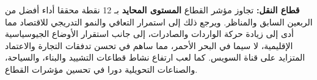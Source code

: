 \textbf{قطاع النقل:} تجاوز مؤشر القطاع \textbf{المستوى المحايد} بـ 12 نقطة محققا أداء أفضل من الربعين السابق والمناظر. ويرجع ذلك إلى استمرار التعافي والنمو التدريجي للاقتصاد مما أدى إلى زيادة حركة الواردات والصادرات، إلى جانب استقرار الأوضاع الجيوسياسية الإقليمية، لا سيما في البحر الأحمر، مما ساهم في تحسن تدفقات التجارة والاعتماد المتزايد على قناة السويس. كما لعب ارتفاع نشاط قطاعات التشييد والبناء، والسياحة، والصناعات التحويلية دورا في تحسين مؤشرات القطاع.
